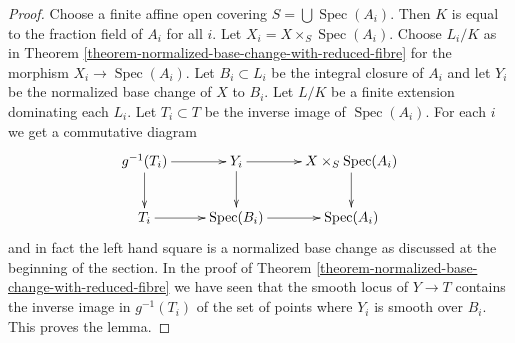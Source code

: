 \documentclass[10pt,a4paper]{amsart}
\theoremstyle{plain}
\theoremstyle{definition}
\theoremstyle{remark}
\numberwithin{equation}{subsection}
\def\Spec{\mathop{\mathrm{Spec}}}
\begin{document}
\begin{proof}
Choose a finite affine open covering $S = \bigcup \Spec(A_i)$.
Then $K$ is equal to the fraction field of $A_i$ for all $i$.
Let $X_i = X \times_S \Spec(A_i)$.
Choose $L_i/K$ as in
Theorem \ref{theorem-normalized-base-change-with-reduced-fibre}
for the morphism $X_i \to \Spec(A_i)$.
Let $B_i \subset L_i$ be the integral closure of $A_i$ and
let $Y_i$ be the normalized base change of $X$ to $B_i$.
Let $L/K$ be a finite extension dominating each $L_i$.
Let $T_i \subset T$ be the inverse image of $\Spec(A_i)$.
For each $i$ we get a commutative diagram
$$
\xymatrix{
g^{-1}(T_i) \ar[r] \ar[d] & Y_i \ar[r] \ar[d] & X \times_S \Spec(A_i) \ar[d] \\
T_i \ar[r] & \Spec(B_i) \ar[r] & \Spec(A_i)
}
$$
and in fact the left hand square is a normalized base change
as discussed at the beginning of the section. In the proof
of Theorem \ref{theorem-normalized-base-change-with-reduced-fibre}
we have seen that the smooth locus of $Y \to T$ contains the
inverse image in $g^{-1}(T_i)$ of the set of points
where $Y_i$ is smooth over $B_i$. This proves the lemma.
\end{proof}
\end{document}
